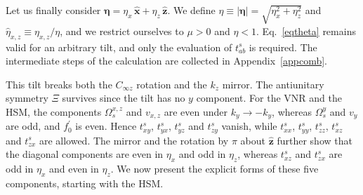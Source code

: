 \documentclass[aps,prb,onecolumn,nofootinbib,citeautoscript,10pt]{revtex4-2}
\newcommand{\bs}[1]{\boldsymbol{#1}}
\begin{document}
Let us finally consider $\bs\eta=\eta_x\,\hat{\bs x}+\eta_z\,\hat{\bs z}$. We define $\eta\equiv|\bs\eta|=\sqrt{\eta_x^2+\eta_z^2}$ and $\hat\eta_{x,z}\equiv\eta_{x,z}/\eta$, and we restrict ourselves to $\mu>0$ and $\eta<1$. Eq.~\eqref{eqtheta} remains valid for an arbitrary tilt, and only the evaluation of $t^s_{ab}$ is required. The intermediate steps of the calculation are collected in Appendix~\ref{appcomb}.

This tilt breaks both the $C_{\infty z}$ rotation and the $k_z$ mirror. The antiunitary symmetry $\Xi$ survives since the tilt has no $y$ component. For the VNR and the HSM, the components $\Omega^{x,z}_s$ and $v_{x,z}$ are even under $k_y\to-k_y$, whereas $\Omega^y_s$ and $v_y$ are odd, and $f_0^\prime$ is even. Hence $t^s_{xy}$, $t^s_{yx}$, $t^s_{yz}$ and $t^s_{zy}$ vanish, while $t^s_{xx}$, $t^s_{yy}$, $t^s_{zz}$, $t^s_{xz}$ and $t^s_{zx}$ are allowed. The mirror and the rotation by $\pi$ about $\hat{\bs z}$ further show that the diagonal components are even in $\eta_x$ and odd in $\eta_z$, whereas $t^s_{xz}$ and $t^s_{zx}$ are odd in $\eta_x$ and even in $\eta_z$. We now present the explicit forms of these five components, starting with the HSM.
\end{document}
